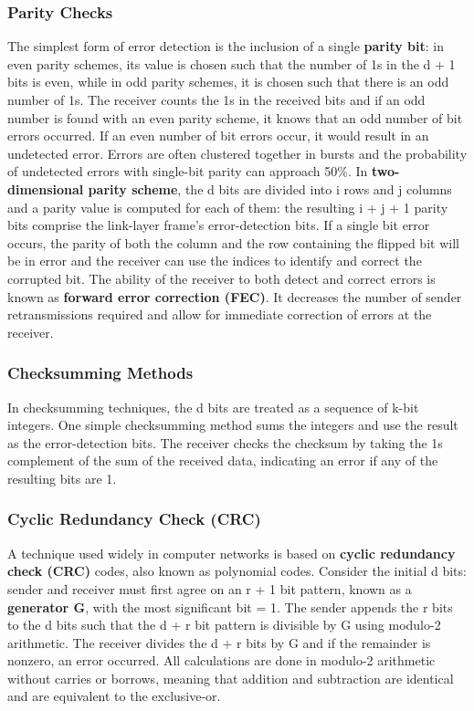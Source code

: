 \documentclass{article}
\begin{document}
\subsubsection{Parity Checks}
The simplest form of error detection is the inclusion of a single \textbf{parity bit}: in even parity schemes, its value is chosen such that the number of 1s in the d + 1 bits is even, while in odd parity schemes, it is chosen such that there is an odd number of 1s.
The receiver counts the 1s in the received bits and if an odd number is found with an even parity scheme, it knows that an odd number of bit errors occurred.
If an even number of bit errors occur, it would result in an undetected error.
Errors are often clustered together in bursts and the probability of undetected errors with single-bit parity can approach 50\%.
In \textbf{two-dimensional parity scheme}, the d bits are divided into i rows and j columns and a parity value is computed for each of them: the resulting i + j + 1 parity bits comprise the link-layer frame’s error-detection bits.
If a single bit error occurs, the parity of both the column and the row containing the flipped bit will be in error and the receiver can use the indices to identify and correct the corrupted bit.
The ability of the receiver to both detect and correct errors is known as \textbf{forward error correction (FEC)}.
It decreases the number of sender retransmissions required and allow for immediate correction of errors at the receiver.
\subsubsection{Checksumming Methods}
In checksumming techniques, the d bits are treated as a sequence of k-bit integers.
One simple checksumming method sums the integers and use the result as the error-detection bits.
The receiver checks the checksum by taking the 1s complement of the sum of the received data, indicating an error if any of the resulting bits are 1.
\subsubsection{Cyclic Redundancy Check (CRC)}
A technique used widely in computer networks is based on \textbf{cyclic redundancy check (CRC)} codes, also known as polynomial codes.
Consider the initial d bits: sender and receiver must first agree on an r + 1 bit pattern, known as a \textbf{generator G}, with the most significant bit = 1.
The sender appends the r bits to the d bits such that the d + r bit pattern is divisible by G using modulo-2 arithmetic.
The receiver divides the d + r bits by G and if the remainder is nonzero, an error occurred.
All calculations are done in modulo-2 arithmetic without carries or borrows, meaning that addition and subtraction are identical and are equivalent to the exclusive-or.
\end{document}
